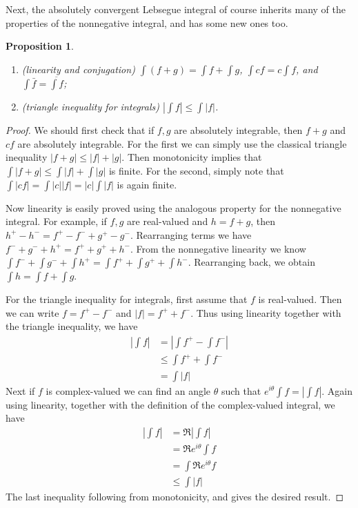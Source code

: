 \documentclass[11pt,oneside]{amsbook}
\theoremstyle{definition}
\theoremstyle{plain}
\newtheorem{prop}[thm]{Proposition}
\theoremstyle{definition}
\theoremstyle{remark}
\numberwithin{equation}{section}
\numberwithin{figure}{section}
\begin{document}
Next, the absolutely convergent Lebsegue integral of course inherits many of the properties of the nonnegative integral, and has some new ones too.

\begin{prop}
  \begin{enumerate}
  \item (linearity and conjugation) $\int(f+g)=\int f+\int g$, $\int cf=c\int f$, and $\int\bar f=\overline{\int f}$;
  \item (triangle inequality for integrals) $\left|\int f\right|\leq\int|f|$.
  \end{enumerate}
\end{prop}

\begin{proof}
  We should first check that if $f,g$ are absolutely integrable, then $f+g$ and $cf$ are absolutely integrable. For the first we can simply use the classical triangle inequality $|f+g|\leq|f|+|g|$. Then monotonicity implies that $\int|f+g|\leq\int|f|+\int|g|$ is finite. For the second, simply note that $\int|cf|=\int|c||f|=|c|\int|f|$ is again finite.

  Now linearity is easily proved using the analogous property for the nonnegative integral. For example, if $f,g$ are real-valued and $h=f+g$, then $h^+-h^-=f^+-f^-+g^+-g^-$. Rearranging terms we have $f^-+g^-+h^+=f^++g^++h^-$. From the nonnegative linearity we know $\int f^-+\int g^-+\int h^+=\int f^++\int g^++\int h^-$. Rearranging back, we obtain $\int h=\int f+\int g$.

  For the triangle inequality for integrals, first assume that $f$ is real-valued. Then we can write $f=f^+-f^-$ and $|f|=f^++f^-$. Thus using linearity together with the triangle inequality, we have
  \begin{align*}
    \left|\int f\right|&=\left|\int f^+-\int f^-\right|\\
                       &\leq\int f^++\int f^-\\
                       &=\int|f|
  \end{align*}
  Next if $f$ is complex-valued we can find an angle $\theta$ such that $e^{i\theta}\int f=\left|\int f\right|$. Again using linearity, together with the definition of the complex-valued integral, we have
  \begin{align*}
    \left|\int f\right|&=\Re\left|\int f\right|\\
                       &=\Re e^{i\theta}\int f\\
                       &=\int \Re e^{i\theta}f\\
                       &\leq\int|f|
  \end{align*}
  The last inequality following from monotonicity, and gives the desired result.
\end{proof}
\end{document}
